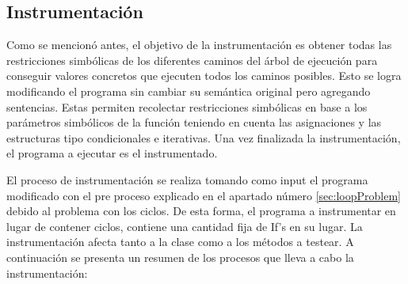 \documentclass{llncs}
\begin{document}
\subsection{Instrumentación}
Como se mencionó antes, el objetivo de la instrumentación es obtener todas las restricciones simbólicas de los diferentes caminos del árbol de
ejecución para conseguir valores concretos que ejecuten todos los caminos posibles. Esto se logra modificando el programa sin cambiar su semántica original
pero agregando sentencias. Estas permiten recolectar restricciones simbólicas en base a los parámetros simbólicos de la función teniendo en cuenta las asignaciones
y las estructuras tipo condicionales e iterativas. Una vez finalizada la instrumentación, el programa a ejecutar es el instrumentado.

El proceso de instrumentación se realiza tomando como input el programa modificado con el pre proceso explicado en el apartado número \ref{sec:loopProblem}
debido al problema con los ciclos. De esta forma, el programa a instrumentar en lugar de contener ciclos, contiene una cantidad fija de If’s en su lugar.
La instrumentación afecta tanto a la clase como a los métodos a testear. A continuación se presenta un resumen de los procesos que lleva a cabo la instrumentación:
\end{document}
